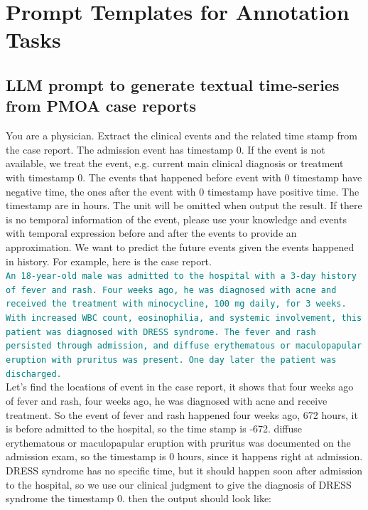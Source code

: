 \section{Prompt Templates for Annotation Tasks}
\label{apd:llm_prompts}

\subsection{LLM prompt to generate textual time-series from PMOA case reports}
\label{apd:extraction_prompt}

\begin{tcolorbox}[colback=gray!5, colframe=gray!100, title=Prompt, boxrule=2pt]
You are a physician. Extract the clinical events and the related time stamp from the case report. The admission event has timestamp 0. If the event is not available, we treat the event, e.g. current main clinical diagnosis or treatment with timestamp 0. The events that happened before event with 0 timestamp have negative time, the ones after the event with 0 timestamp have positive time. The timestamp are in hours. The unit will be omitted when output the result. If there is no temporal information of the event, please use your knowledge and events with temporal expression before and after the events to provide an approximation. We want to predict the future events given the events happened in history. For example, here is the case report.\\

\textcolor{teal}{\texttt{An 18-year-old male was admitted to the hospital with a 3-day history of fever and rash. Four weeks ago, he was diagnosed with acne and received the treatment with minocycline, 100 mg daily, for 3 weeks. With increased WBC count, eosinophilia, and systemic involvement, this patient was diagnosed with DRESS syndrome. The fever and rash persisted through admission, and diffuse erythematous or maculopapular eruption with pruritus was present. One day later the patient was discharged.}}\\

Let's find the locations of event in the case report, it shows that four weeks ago of fever and rash, four weeks ago, he was diagnosed with acne and receive treatment. So the event of fever and rash happened four weeks ago, 672 hours, it is before admitted to the hospital, so the time stamp is -672. diffuse erythematous or maculopapular eruption with pruritus was documented on the admission exam, so the timestamp is 0 hours, since it happens right at admission. DRESS syndrome has no specific time, but it should happen soon after admission to the hospital, so we use our clinical judgment to give the diagnosis of DRESS syndrome the timestamp 0. then the output should look like:\\


\end{tcolorbox}
